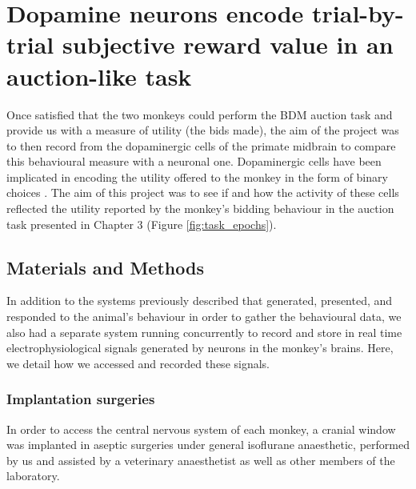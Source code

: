 \chapter{Dopamine neurons encode trial-by-trial
subjective reward value in an auction-like task}

\ifpdf
    \graphicspath{{Chapter4/Figs/Raster/}{Chapter4/Figs/PDF/}{Chapter4/Figs/}}
\else
    \graphicspath{{Chapter4/Figs/Vector/}{Chapter4/Figs/}}
\fi

Once satisfied that the two monkeys could perform the BDM auction task and provide us with a measure of utility (the bids made), the aim of the project was to then record from the dopaminergic cells of the primate midbrain to compare this behavioural measure with a neuronal one. Dopaminergic cells have been implicated in encoding the utility offered to the monkey in the form of binary choices \cite{staufferDopamineRewardPrediction2014}. The aim of this project was to see if and how the activity of these cells reflected the utility reported by the monkey's bidding behaviour in the auction task presented in Chapter 3 (Figure \ref{fig:task_epochs}).

\clearpage
\section{Materials and Methods}
In addition to the systems previously described that generated, presented, and responded to the animal's behaviour in order to gather the behavioural data, we also had a separate system running concurrently to record and store in real time electrophysiological signals generated by neurons in the monkey's brains. Here, we detail how we accessed and recorded these signals.

\subsection{Implantation surgeries}
In order to access the central nervous system of each monkey, a cranial window was implanted in aseptic surgeries under general isoflurane anaesthetic, performed by us and assisted by a veterinary anaesthetist as well as other members of the laboratory.


